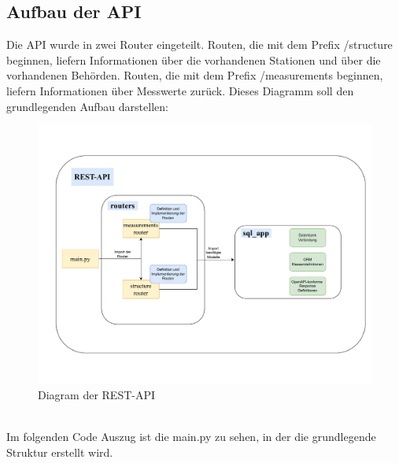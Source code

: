 \subsection{Aufbau der API}
Die API wurde in zwei Router eingeteilt. 
Routen, die mit dem Prefix /structure beginnen, liefern Informationen über die 
vorhandenen Stationen und über die vorhandenen Behörden. 
Routen, die mit dem Prefix /measurements beginnen, liefern Informationen über 
Messwerte zurück. Dieses Diagramm soll den grundlegenden Aufbau darstellen: ~\\

\begin{figure}[H]
    \centering
    \includegraphics[width=\linewidth]{figures/REST-API-Aufbau.drawio.pdf}
    \caption{Diagram der REST-API}
    \label{fig:REST-API-Structure}
\end{figure}~\\
Im folgenden Code Auszug ist die main.py zu sehen, in der die grundlegende Struktur erstellt wird.~\\

